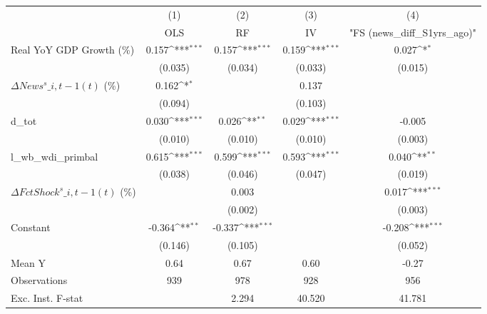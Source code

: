 {
\def\sym#1{\ifmmode^{#1}\else\(^{#1}\)\fi}
\begin{tabular}{l*{4}{c}}
\toprule
                    &\multicolumn{1}{c}{(1)}&\multicolumn{1}{c}{(2)}&\multicolumn{1}{c}{(3)}&\multicolumn{1}{c}{(4)}\\
                    &\multicolumn{1}{c}{OLS}&\multicolumn{1}{c}{RF}&\multicolumn{1}{c}{IV}&\multicolumn{1}{c}{ "FS (news\_diff\_S1yrs\_ago)" }\\
\midrule
Real YoY GDP Growth (\%)&       0.157\sym{***}&       0.157\sym{***}&       0.159\sym{***}&       0.027\sym{*}  \\
                    &     (0.035)         &     (0.034)         &     (0.033)         &     (0.015)         \\
\addlinespace
$ \Delta News^s\_{i,t-1}(t)$ (\%)&       0.162\sym{*}  &                     &       0.137         &                     \\
                    &     (0.094)         &                     &     (0.103)         &                     \\
\addlinespace
d\_tot               &       0.030\sym{***}&       0.026\sym{**} &       0.029\sym{***}&      -0.005         \\
                    &     (0.010)         &     (0.010)         &     (0.010)         &     (0.003)         \\
\addlinespace
l\_wb\_wdi\_primbal    &       0.615\sym{***}&       0.599\sym{***}&       0.593\sym{***}&       0.040\sym{**} \\
                    &     (0.038)         &     (0.046)         &     (0.047)         &     (0.019)         \\
\addlinespace
$ \Delta FctShock^s\_{i,t-1}(t)$ (\%)&                     &       0.003         &                     &       0.017\sym{***}\\
                    &                     &     (0.002)         &                     &     (0.003)         \\
\addlinespace
Constant            &      -0.364\sym{**} &      -0.337\sym{***}&                     &      -0.208\sym{***}\\
                    &     (0.146)         &     (0.105)         &                     &     (0.052)         \\
\midrule
Mean Y              &        0.64         &        0.67         &        0.60         &       -0.27         \\
Observations        &         939         &         978         &         928         &         956         \\
Exc. Inst. F-stat   &                     &       2.294         &      40.520         &      41.781         \\
\bottomrule
\end{tabular}
}
